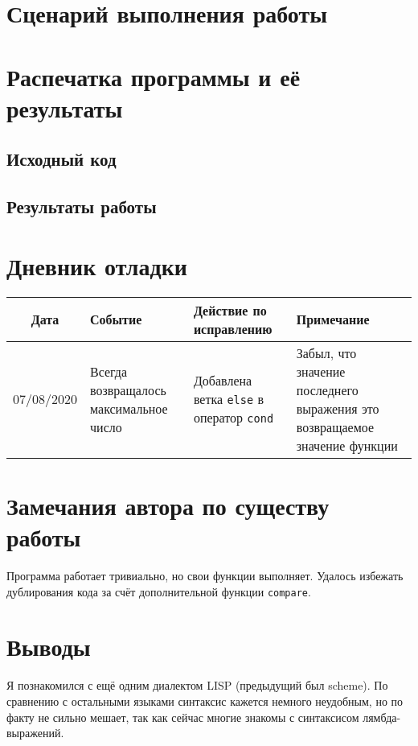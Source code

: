 \documentclass[12pt]{article}
\begin{document}
\section{Сценарий выполнения работы}

\section{Распечатка программы и её результаты}

\subsection{Исходный код}

\subsection{Результаты работы}

\section{Дневник отладки}
\noindent
\begin{tabularx}{\linewidth}{|c|X|X|X|}
\hline
Дата & Событие & Действие по исправлению & Примечание \\
\hline
07/08/2020 & Всегда возвращалось максимальное число & Добавлена ветка {\tt else} в оператор {\tt cond} & Забыл, что значение последнего выражения это возвращаемое значение функции \\
\hline
\end{tabularx}

\section{Замечания автора по существу работы}
Программа работает тривиально, но свои функции выполняет. Удалось избежать дублирования кода за счёт
дополнительной функции {\tt compare}.

\section{Выводы}
Я познакомился с ещё одним диалектом LISP (предыдущий был scheme). По сравнению с остальными языками
синтаксис кажется немного неудобным, но по факту не сильно мешает, так как сейчас многие знакомы с
синтаксисом лямбда-выражений.
\end{document}
